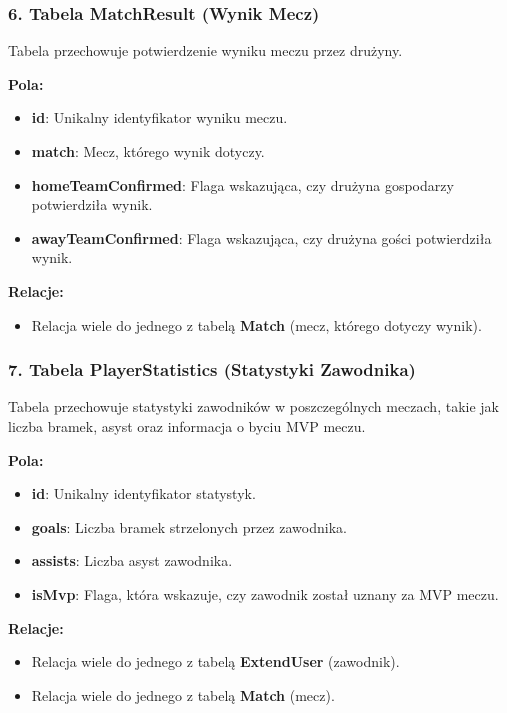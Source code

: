 \documentclass[wmii,inf,inz]{uwmthesis} %
\newenvironment{indenteditemize}
{\begin{itemize}[left=1cm]} %
{\end{itemize}}
\begin{document}
\subsubsection{6. Tabela MatchResult (Wynik Mecz)}
Tabela przechowuje potwierdzenie wyniku meczu przez drużyny.

\textbf{Pola:}
\begin{indenteditemize}
    \item \textbf{id}: Unikalny identyfikator wyniku meczu.
    \item \textbf{match}: Mecz, którego wynik dotyczy.
    \item \textbf{homeTeamConfirmed}: Flaga wskazująca, czy drużyna gospodarzy potwierdziła wynik.
    \item \textbf{awayTeamConfirmed}: Flaga wskazująca, czy drużyna gości potwierdziła wynik.
\end{indenteditemize}

\textbf{Relacje:}
\begin{indenteditemize}
    \item Relacja wiele do jednego z tabelą \textbf{Match} (mecz, którego dotyczy wynik).
\end{indenteditemize}

\subsubsection{7. Tabela PlayerStatistics (Statystyki Zawodnika)}
Tabela przechowuje statystyki zawodników w poszczególnych meczach, takie jak liczba bramek, asyst oraz informacja o byciu MVP meczu.

\textbf{Pola:}
\begin{indenteditemize}
    \item \textbf{id}: Unikalny identyfikator statystyk.
    \item \textbf{goals}: Liczba bramek strzelonych przez zawodnika.
    \item \textbf{assists}: Liczba asyst zawodnika.
    \item \textbf{isMvp}: Flaga, która wskazuje, czy zawodnik został uznany za MVP meczu.
\end{indenteditemize}

\textbf{Relacje:}
\begin{indenteditemize}
    \item Relacja wiele do jednego z tabelą \textbf{ExtendUser} (zawodnik).
    \item Relacja wiele do jednego z tabelą \textbf{Match} (mecz).
\end{indenteditemize}
\end{document}
